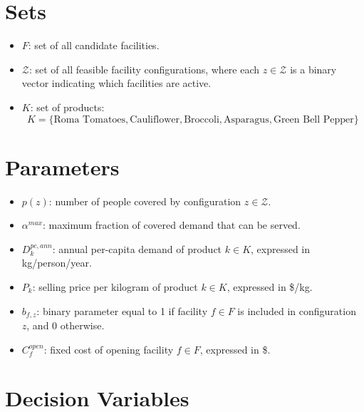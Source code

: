 \documentclass[12pt]{article}
\begin{document}
\newpage

\section{Sets}
\begin{itemize}
    \item $F$: set of all candidate facilities.
    
    \item $\mathcal{Z}$: set of all feasible facility configurations, where each $z \in \mathcal{Z}$ is a binary vector indicating which facilities are active.
    
    \item $K$: set of products:
    \[
    K = \{\text{Roma Tomatoes}, \text{Cauliflower}, \text{Broccoli}, \text{Asparagus}, \text{Green Bell Pepper}\}
    \]
\end{itemize}

\newpage

\section{Parameters}

\begin{itemize}
    \item $p(z)$: number of people covered by configuration $z \in \mathcal{Z}$.
    
    \item $\alpha^{max}$: maximum fraction of covered demand that can be served.
    
    \item $D^{pc,ann}_k$: annual per-capita demand of product $k \in K$, expressed in kg/person/year.
    
    \item $P_k$: selling price per kilogram of product $k \in K$, expressed in \$/kg.
    
    \item $b_{f,z}$: binary parameter equal to 1 if facility $f \in F$ is included in configuration $z$, and 0 otherwise.
    
    \item $C^{open}_f$: fixed cost of opening facility $f \in F$, expressed in \$.
\end{itemize}

\newpage

\section{Decision Variables}
\end{document}
